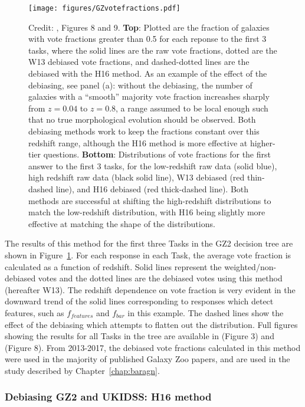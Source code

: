 \begin{figure}
\centering
\texttt{[image: figures/GZvotefractions.pdf]}
\caption{Credit: \citet{Hart2016}, Figures 8 and 9. \textbf{Top}: Plotted are the fraction of galaxies with vote fractions greater than 0.5 for each reponse to the first 3 tasks, where the solid lines are the raw vote fractions, dotted are the W13 debiased vote fractions, and dashed-dotted lines are the debiased with the H16 method. As an example of the effect of the debiasing, see panel (a): without the debiasing, the number of galaxies with a ``smooth'' majority vote fraction increashes sharply from $z=0.04$ to $z=0.8$, a range assumed to be local enough such that no true morphological evolution should be observed. Both debiasing methods work to keep the fractions constant over this redshift range, although the H16 method is more effective at higher-tier questions. \textbf{Bottom}: Distributions of vote fractions for the first answer to the first 3 tasks, for the low-redshift raw data (solid blue), high redshift raw data (black solid line), W13 debiased (red thin-dashed line), and H16 debiased (red thick-dashed line). Both methods are successful at shifting the high-redshift distributions to match the low-redshift distribution, with H16 being slightly more effective at matching the shape of the distributions.}
\label{fig:gz2debiasingresults}
\end{figure}

The results of this method for the first three Tasks in the GZ2 decision tree are shown in Figure~\ref{fig:gz2debiasingresults}. For each response in each Task, the average vote fraction is calculated as a function of redshift. Solid lines represent the weighted/non-debiased votes and the dotted lines are the debiased votes using this method (hereafter W13).
The redshift dependence on vote fraction is very evident in the downward trend of the solid lines corresponding to responses which detect features, such as $f_{features}$ and $f_{bar}$ in this example. The dashed lines show the effect of the debiasing which attempts to flatten out the distribution. Full figures showing the results for all Tasks in the tree are available in \citet{Willett2013} (Figure 3) and \citet{Hart2016} (Figure 8). From 2013-2017, the debiased vote fractions calculated in this method were used in the majority of published Galaxy Zoo papers, and are used in the study described by Chapter~\ref{chap:baragn}. 


\subsubsection{Debiasing GZ2 and UKIDSS: H16 method}

